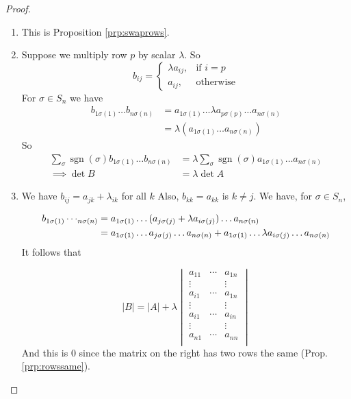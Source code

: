\documentclass{article}
\theoremstyle{definition} \newtheorem*{definition}{Definition}
\DeclareMathOperator{\sgn}{sgn} \DeclareMathOperator{\id}{id}
\begin{document}
\begin{proof}\hfill \begin{enumerate} \item This is Proposition
        \ref{prp:swaprows}.  \item Suppose we multiply row $p$ by scalar
          $\lambda$. So \[ b_{ij} = \begin{cases} \lambda a_{ij}, & \text{if }
              i=p \\ a_{ij}, & \text{otherwise} \end{cases} \] For $\sigma \in
            S_n$ we have \begin{align*} b_{1\sigma(1)}\dots b_{n\sigma(n)} &=
              a_{1\sigma(1)}\dots \lambda a_{p\sigma(p)}\dots a_{n \sigma(n)}
              \\ &= \lambda (  a_{1\sigma(1)}\dots  a_{n\sigma(n)} )
            \end{align*} So \begin{align*} \sum_\sigma \sgn (\sigma)
              b_{1\sigma(1)}\dots b_{n\sigma(n)} &= \lambda \sum_\sigma
              \sgn(\sigma)  a_{1\sigma(1)}\dots a_{n\sigma(n)}\\ \implies \det
              B &= \lambda \det A \end{align*} \item We have $b_{ij} = a_{jk} +
              \lambda_{ik}$ for all $k$ Also, $b_{kk}=a_{kk}$ is $k \neq j$. We
              have, for $\sigma \in S_n$,

      \begin{align*} b_{1\sigma(1)}\dotsb_{n\sigma(n)} &= a_{1 \sigma(1)} \dots
        ( a_{j \sigma(j)} + \lambda  a_{i \sigma(j)} ) \dots a_{n\sigma(n)} \\
        &= a_{{1}\sigma(1)} \dots a_{{j}\sigma(j)} \dots a_{{n}\sigma(n)} + a_{{1}\sigma(1)}
        \dots \lambda a_{i\sigma(j)} \dots a_{n\sigma(n)} \end{align*} It
      follows that

      \[ |B| = |A| + \lambda \begin{vmatrix} a_{11} & \cdots & a_{1n}\\ \vdots
          &        & \vdots \\ a_{i1} & \cdots & a_{1n} \\ \vdots &        &
          \vdots \\ a_{i1} & \cdots & a_{in} \\ \vdots &        & \vdots \\
          a_{n1} & \cdots & a_{nn} \\ \end{vmatrix} \] And this is 0 since the
        matrix on the right has two rows the same (Prop. \ref{prp:rowssame}).
    \end{enumerate} \end{proof}
\end{document}
